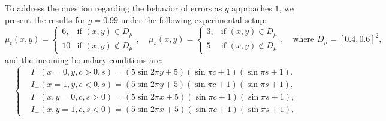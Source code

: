 


To address the question regarding the behavior of errors as $g$ approaches $1$, we present the results for $g = 0.99$ under the following experimental setup:
\begin{equation}
	\mu_t(x,y) =
	\begin{cases}
		6, & \text{if } (x,y) \in D_\mu    \\
		10 & \text{if } (x,y) \notin D_\mu
	\end{cases},
	\quad
	\mu_s(x,y) =
	\begin{cases}
		3, & \text{if } (x,y) \in D_\mu    \\
		5  & \text{if } (x,y) \notin D_\mu
	\end{cases},
	\quad \text{where } D_\mu = [0.4, 0.6]^2,
\end{equation}
and the incoming boundary conditions are:
\begin{equation}
	\left \{
	\begin{aligned}
		 & I_-(x=0,y,c>0,s) =(5\sin{2\pi y}+5)(\sin{\pi c}+1)(\sin{\pi s}+1),  \\
		 & I_-(x=1,y,c<0,s) = (5\sin{2\pi y}+5)(\sin{\pi c}+1)(\sin{\pi s}+1),
		\\
		 & I_-(x,y=0,c,s>0) =(5\sin{2\pi x}+5)(\sin{\pi c}+1)(\sin{\pi s}+1),
		\\
		 & I_-(x,y=1,c,s<0) =(5\sin{2\pi x}+5)(\sin{\pi c}+1)(\sin{\pi s}+1),
	\end{aligned}
	\right.
\end{equation}

